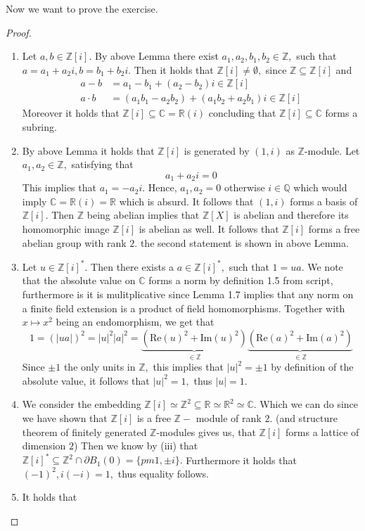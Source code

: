 \documentclass[10pt,a4paper]{article}
\newcommand{\RR}{\mathbb{R}}
\newcommand{\real}{\mathrm{Re}}
\newcommand{\imag}{\mathrm{Im}}
\newcommand{\CC}{\mathbb{C}}
\newcommand{\QQ}{\mathbb{Q}}
\newcommand{\ZZ}{\mathbb{Z}}
\begin{document}
	Now we want to prove the exercise.
	\begin{proof}
		\begin{enumerate}[label = (\roman*)]
			\item Let $a,b\in \ZZ[i].$ By above Lemma there exist $a_1,a_2,b_1,b_2\in \ZZ,$ such that $a = a_1+a_2i, b = b_1+b_2i.$ Then it holds that $\ZZ[i]\neq \emptyset,$ since $\ZZ\subseteq \ZZ[i]$ and
			\[\begin{split}
				a-b &= a_1-b_1 + (a_2 - b_2)i \in \ZZ[i]\\
				a\cdot b &= (a_1b_1 - a_2b_2) + (a_1b_2 + a_2b_1)i\in \ZZ[i]
			\end{split}\]
			Moreover it holds that $\ZZ[i]\subseteq \CC = \RR(i)$ concluding that $\ZZ[i]\subseteq \CC$ forms a subring.
			\item By above Lemma it holds that $\ZZ[i]$ is generated by $(1, i)$ as $\ZZ$-module. Let $a_1,a_2\in \ZZ,$ satisfying that
			\[a_1 + a_2i = 0\]
			This implies that $a_1 = -a_2i.$ Hence, $a_1,a_2 = 0$ otherwise $i\in \QQ$ which would imply $\CC = \RR(i) = \RR$ which is absurd. It follows that $(1,i)$ forms a basis of $\ZZ[i].$ Then $\ZZ$ being abelian implies that $\ZZ[X]$ is abelian and therefore its homomorphic image $\ZZ[i]$ is abelian as well. It follows that $\ZZ[i]$ forms a free abelian group with rank $2.$ the second statement is shown in above Lemma.
			\item Let $u\in \ZZ[i]^*.$ Then there exists a $a\in \ZZ[i]^*,$ such that $1 = ua.$ We note that the absolute value on $\CC$ forms a norm by definition 1.5 from script, furthermore is it is mulitplicative since Lemma 1.7 implies that any norm on a finite field extension is a product of field homomorphisms. Together with $x\mapsto x^2$ being an endomorphism, we get that
			\[1 = (|ua|)^2= |u|^2|a|^2 = \underbrace{(\real(u)^2 + \imag(u)^2)}_{\in \ZZ}\underbrace{(\real(a)^2+\imag(a)^2)}_{\in \ZZ}\]
			Since $\pm 1$ the only units in $\ZZ,$ this implies that $|u|^2 = \pm1$ by definition of the absolute value, it follows that $|u|^2=1,$ thus $|u| = 1.$
			\item We consider the embedding $\ZZ[i]\simeq \ZZ^2\subseteq \RR\simeq \RR^2\simeq \CC.$ Which we can do since we have shown that $\ZZ[i]$ is a free $\ZZ-$ module of rank $2.$ (and structure theorem of finitely generated $\ZZ$-modules gives us, that $\ZZ[i]$ forms a lattice of dimension $2$) Then we know by (iii) that $\ZZ[i]^*\subseteq \ZZ^2\cap\partial B_{1}(0) = \{pm1, \pm i\}.$ Furthermore it holds that $(-1)^2, i(-i) = 1,$ thus equality follows. 
			\item It holds that

\end{enumerate}
\end{proof}
\end{document}

